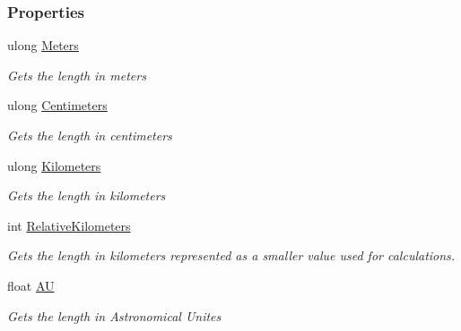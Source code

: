 \subsubsection*{Properties}
\begin{DoxyCompactItemize}
\item 
ulong \hyperlink{class_midnight_blue_1_1_length_ac824fa58d75ab754c33cdc8bfd49e5b0}{Meters}
\begin{DoxyCompactList}\small\item\em Gets the length in meters \end{DoxyCompactList}\item 
ulong \hyperlink{class_midnight_blue_1_1_length_a935aac3abfc2865e5960a40382227063}{Centimeters}
\begin{DoxyCompactList}\small\item\em Gets the length in centimeters \end{DoxyCompactList}\item 
ulong \hyperlink{class_midnight_blue_1_1_length_abf0d08eda94640cdb4706f96c3a97a29}{Kilometers}
\begin{DoxyCompactList}\small\item\em Gets the length in kilometers \end{DoxyCompactList}\item 
int \hyperlink{class_midnight_blue_1_1_length_a7073632b5e2dfc836266de44378941be}{Relative\+Kilometers}
\begin{DoxyCompactList}\small\item\em Gets the length in kilometers represented as a smaller value used for calculations. \end{DoxyCompactList}\item 
float \hyperlink{class_midnight_blue_1_1_length_aa2325bd4894b015715784b027551826f}{AU}
\begin{DoxyCompactList}\small\item\em Gets the length in Astronomical Unites \end{DoxyCompactList}\end{DoxyCompactItemize}


